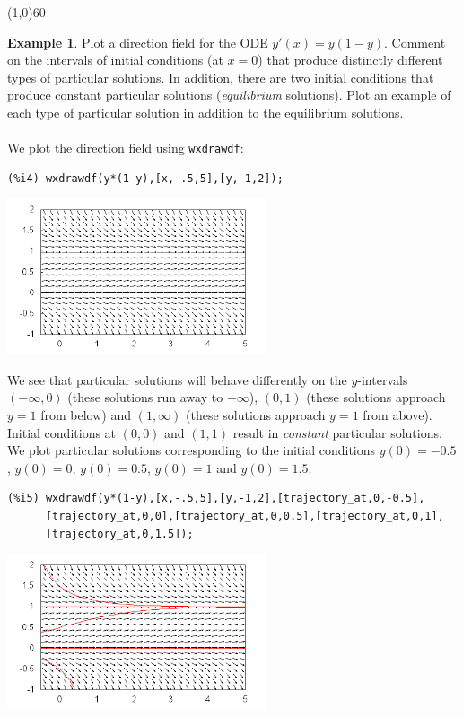 \documentclass[10.5pt,twoside]{report}
\theoremstyle{definition}
\newtheorem{exmp}{Example}[section]
\begin{document}
\line(1,0){60}
\linethickness{0.5mm}
\pagebreak

\begin{exmp} Plot a direction field for the ODE $y'(x)=y(1-y)$.  Comment on the intervals of initial conditions (at $x=0$) that produce distinctly different types of particular solutions.  In addition, there are two initial conditions that produce constant particular solutions (\textit{equilibrium} solutions).  Plot an example of each type of particular solution in addition to the equilibrium solutions.\\
${}$\\
We plot the direction field using \verb|wxdrawdf|:

\begin{verbatim}
(%i4) wxdrawdf(y*(1-y),[x,-.5,5],[y,-1,2]);
\end{verbatim}

\includegraphics[width=3in]{example_4_4_2_1}

We see that particular solutions will behave differently on the $y$-intervals $(-\infty,0)$ (these solutions run away to $-\infty$), $(0,1)$ (these solutions approach $y=1$ from below) and $(1,\infty)$ (these solutions approach $y=1$ from above). Initial conditions at $(0,0)$ and $(1,1)$ result in \textit{constant} particular solutions.  We plot particular solutions corresponding to the initial conditions $y(0)=-0.5$, $y(0)=0$, $y(0)=0.5$, $y(0)=1$ and $y(0)=1.5$:

\begin{verbatim}
(%i5) wxdrawdf(y*(1-y),[x,-.5,5],[y,-1,2],[trajectory_at,0,-0.5],
      [trajectory_at,0,0],[trajectory_at,0,0.5],[trajectory_at,0,1],
      [trajectory_at,0,1.5]);
\end{verbatim}

\includegraphics[width=3in]{example_4_4_2_2}

\end{exmp}
\end{document}
